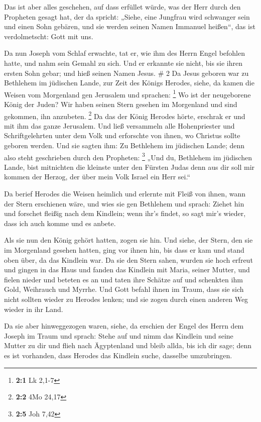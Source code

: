  Das ist aber alles geschehen, auf dass erfüllet würde, was
der Herr durch den Propheten gesagt hat, der da spricht: 
„Siehe, eine Jungfrau wird schwanger sein und einen Sohn gebären, und
sie werden seinen Namen Immanuel heißen``, das ist verdolmetscht: Gott
mit uns.

 Da nun Joseph vom Schlaf erwachte, tat er, wie ihm des
Herrn Engel befohlen hatte, und nahm sein Gemahl zu sich. 
Und er erkannte sie nicht, bis sie ihren ersten Sohn gebar; und hieß
seinen Namen Jesus. \# 2  Da Jesus geboren war zu Bethlehem
im jüdischen Lande, zur Zeit des Königs Herodes, siehe, da kamen die
Weisen vom Morgenland gen Jerusalem und sprachen: \footnote{\textbf{2:1}
  Lk 2,1-7}  Wo ist der neugeborene König der Juden? Wir
haben seinen Stern gesehen im Morgenland und sind gekommen, ihn
anzubeten. \footnote{\textbf{2:2} 4Mo 24,17}  Da das der
König Herodes hörte, erschrak er und mit ihm das ganze Jerusalem.
 Und ließ versammeln alle Hohenpriester und Schriftgelehrten
unter dem Volk und erforschte von ihnen, wo Christus sollte geboren
werden.  Und sie sagten ihm: Zu Bethlehem im jüdischen
Lande; denn also steht geschrieben durch den Propheten: \footnote{\textbf{2:5}
  Joh 7,42}  „Und du, Bethlehem im jüdischen Lande, bist
mitnichten die kleinste unter den Fürsten Judas denn aus dir soll mir
kommen der Herzog, der über mein Volk Israel ein Herr sei.``

 Da berief Herodes die Weisen heimlich und erlernte mit
Fleiß von ihnen, wann der Stern erschienen wäre,  und wies
sie gen Bethlehem und sprach: Ziehet hin und forschet fleißig nach dem
Kindlein; wenn ihr's findet, so sagt mir's wieder, dass ich auch komme
und es anbete.

 Als sie nun den König gehört hatten, zogen sie hin. Und
siehe, der Stern, den sie im Morgenland gesehen hatten, ging vor ihnen
hin, bis dass er kam und stand oben über, da das Kindlein war.
 Da sie den Stern sahen, wurden sie hoch erfreut
 und gingen in das Haus und fanden das Kindlein mit Maria,
seiner Mutter, und fielen nieder und beteten es an und taten ihre
Schätze auf und schenkten ihm Gold, Weihrauch und Myrrhe. 
Und Gott befahl ihnen im Traum, dass sie sich nicht sollten wieder zu
Herodes lenken; und sie zogen durch einen anderen Weg wieder in ihr
Land.

 Da sie aber hinweggezogen waren, siehe, da erschien der
Engel des Herrn dem Joseph im Traum und sprach: Stehe auf und nimm das
Kindlein und seine Mutter zu dir und flieh nach Ägyptenland und bleib
allda, bis ich dir sage; denn es ist vorhanden, dass Herodes das
Kindlein suche, dasselbe umzubringen.

